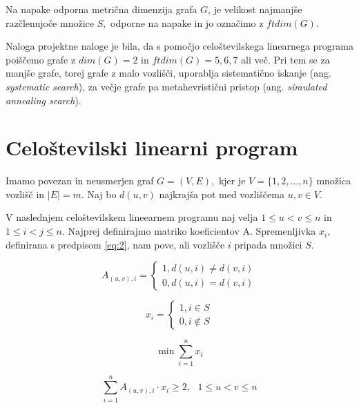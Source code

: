 \documentclass[12pt]{article}
\begin{document}
Na napake odporna metrična dimenzija grafa $G$, je velikost najmanjše razčlenujoče 
množice $S,$ odporne na napake in jo označimo z $ftdim(G).$
\vspace{0,5 cm}

Naloga projektne naloge je bila, da s pomočjo celoštevilskega linearnega programa 
poiščemo grafe z $dim(G) = 2$ in $ftdim(G) = 5, 6, 7$ ali več. Pri tem se za manjše
grafe, torej grafe z malo vozlišči, uporablja sistematično iskanje (ang.\textit{
systematic search}), za večje grafe pa metahevristični pristop (ang.\textit{ simulated 
annealing search}).

\section{Celoštevilski linearni program}

Imamo povezan in neusmerjen graf $G = (V, E),$ kjer je $V = \{1, 2, \ldots, n\}$
množica vozlišč in $\mid E \mid = m.$ Naj bo $d(u, v)$ najkrajša pot med vozliščema
$u, v \in V.$

V naslednjem celoštevilskem lineearnem programu naj velja $1 \leq u < v \leq n$ in 
$1 \leq i < j \leq n.$ Najprej definirajmo matriko koeficientov A. Spremenljivka $x_i,$ 
definirana s predpisom \eqref{eq:2}, nam pove, ali vozlišče $i$ pripada množici $S.$ 

\begin{equation}
    A_{(u, v), i} = \begin{cases}
        1, d(u, i) \neq d(v, i) \\
        0, d(u, i) = d(v, i)
    \end{cases}
\label{eq:1}
\end{equation}

\begin{equation}
    x_i = \begin{cases}
        1, i \in S \\
        0, i \notin S
    \end{cases}
\label{eq:2}
\end{equation} 

\begin{equation}
    \min \sum_{i = 1}^{n} x_i  
\label{eq:3}
\end{equation}

\begin{equation}
    \sum_{i = 1}^{n} A_{(u, v), i} \cdot x_i \geq 2, \text{ } 1 \leq u < v \leq n 
\label{eq:4}
\end{equation}
\end{document}
